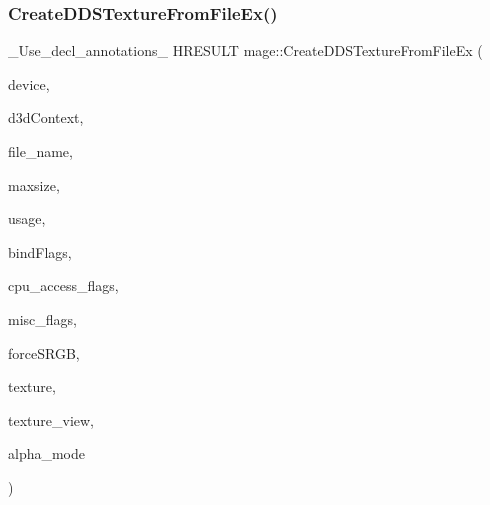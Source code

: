 \subsubsection{\texorpdfstring{Create\+D\+D\+S\+Texture\+From\+File\+Ex()}{CreateDDSTextureFromFileEx()}\hspace{0.1cm}{\footnotesize\ttfamily [4/4]}}
{\footnotesize\ttfamily \+\_\+\+Use\+\_\+decl\+\_\+annotations\+\_\+ H\+R\+E\+S\+U\+LT mage\+::\+Create\+D\+D\+S\+Texture\+From\+File\+Ex (\begin{DoxyParamCaption}\item[{\hyperlink{namespacemage_ae74f374780900893caa5555d1031fd79}{Com\+Ptr}$<$ I\+D3\+D11\+Device2 $>$}]{device,  }\item[{I\+D3\+D11\+Device\+Context $\ast$}]{d3d\+Context,  }\item[{const wchar\+\_\+t $\ast$}]{file\+\_\+name,  }\item[{size\+\_\+t}]{maxsize,  }\item[{D3\+D11\+\_\+\+U\+S\+A\+GE}]{usage,  }\item[{uint32\+\_\+t}]{bind\+Flags,  }\item[{uint32\+\_\+t}]{cpu\+\_\+access\+\_\+flags,  }\item[{uint32\+\_\+t}]{misc\+\_\+flags,  }\item[{bool}]{force\+S\+R\+GB,  }\item[{I\+D3\+D11\+Resource $\ast$$\ast$}]{texture,  }\item[{I\+D3\+D11\+Shader\+Resource\+View $\ast$$\ast$}]{texture\+\_\+view,  }\item[{\hyperlink{namespacemage_a0c586a2bad862f4858900ca121ca80c2}{D\+D\+S\+\_\+\+A\+L\+P\+H\+A\+\_\+\+M\+O\+DE} $\ast$}]{alpha\+\_\+mode }\end{DoxyParamCaption})}

\hypertarget{namespacemage_a3480e988e224d62f6dbbd180920a1fa6}{}\label{namespacemage_a3480e988e224d62f6dbbd180920a1fa6} 

